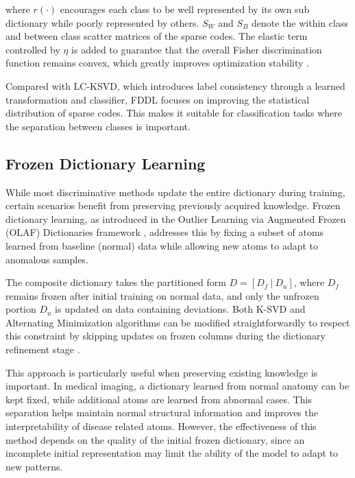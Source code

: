 where \(r(\cdot)\) encourages each class to be well represented by its own 
sub dictionary while poorly represented by others. \(S_W\) and \(S_B\) denote 
the within class and between class scatter matrices of the sparse codes. 
The elastic term controlled by \(\eta\) is added to guarantee that the overall 
Fisher discrimination function remains convex, which greatly improves optimization 
stability \cite{yang2011fddl}.

Compared with LC-KSVD, which introduces label consistency through a learned
transformation and classifier, FDDL focuses on improving the statistical
distribution of sparse codes. This makes it suitable for classification tasks
where the separation between classes is important.

\subsection{Frozen Dictionary Learning}
\label{sec:lit-frozen}

While most discriminative methods update the entire dictionary during training, 
certain scenarios benefit from preserving previously acquired knowledge. 
Frozen dictionary learning, as introduced in the Outlier Learning via Augmented 
Frozen (OLAF) Dictionaries framework \cite{carroll2017frozen}, addresses this 
by fixing a subset of atoms learned from baseline (normal) data while allowing 
new atoms to adapt to anomalous samples.

The composite dictionary takes the partitioned form \(D = [D_f \ | \ D_u]\), 
where \(D_f\) remains frozen after initial training on normal data, and only 
the unfrozen portion \(D_u\) is updated on data containing deviations. Both 
K-SVD and Alternating Minimization algorithms can be modified straightforwardly 
to respect this constraint by skipping updates on frozen columns during the 
dictionary refinement stage \cite{carroll2017frozen}.

This approach is particularly useful when preserving existing knowledge is 
important. In medical imaging, a dictionary learned from normal anatomy can be 
kept fixed, while additional atoms are learned from abnormal cases. This 
separation helps maintain normal structural information and improves the 
interpretability of disease related atoms. However, the effectiveness of this 
method depends on the quality of the initial frozen dictionary, since an 
incomplete initial representation may limit the ability of the model to adapt 
to new patterns.

